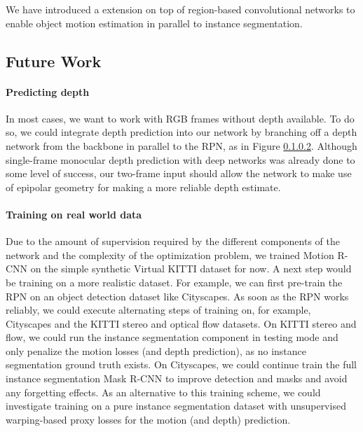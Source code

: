 We have introduced a extension on top of region-based convolutional networks to enable object motion estimation
in parallel to instance segmentation.

\subsection{Future Work}
\paragraph{Predicting depth}
In most cases, we want to work with RGB frames without depth available.
To do so, we could integrate depth prediction into our network by branching off a
depth network from the backbone in parallel to the RPN, as in Figure \ref{}.
Although single-frame monocular depth prediction with deep networks was already done
to some level of success,
our two-frame input should allow the network to make use of epipolar
geometry for making a more reliable depth estimate.

\paragraph{Training on real world data}
Due to the amount of supervision required by the different components of the network
and the complexity of the optimization problem,
we trained Motion R-CNN on the simple synthetic Virtual KITTI dataset for now.
A next step would be training on a more realistic dataset.
For example, we can first pre-train the RPN on an object detection dataset like
Cityscapes. As soon as the RPN works reliably, we could execute alternating
steps of training on, for example, Cityscapes and the KITTI stereo and optical flow datasets.
On KITTI stereo and flow, we could run the instance segmentation component in testing mode and only penalize
the motion losses (and depth prediction), as no instance segmentation ground truth exists.
On Cityscapes, we could continue train the full instance segmentation Mask R-CNN to
improve detection and masks and avoid any forgetting effects.
As an alternative to this training scheme, we could investigate training on a pure
instance segmentation dataset with unsupervised warping-based proxy losses for the motion (and depth) prediction.
